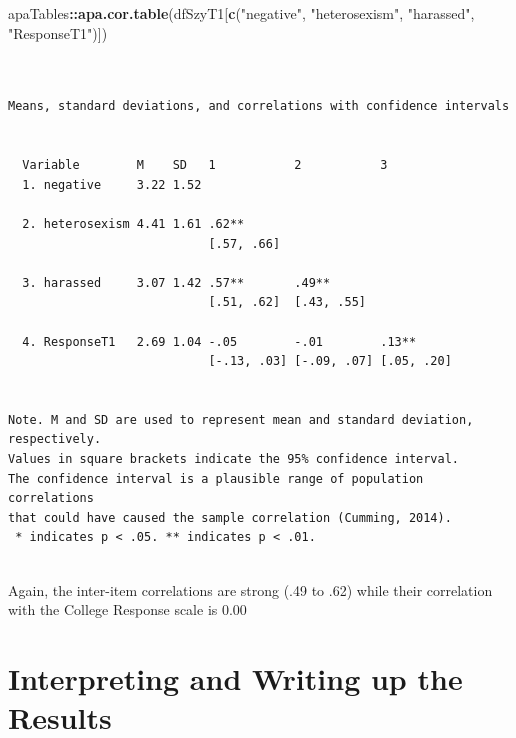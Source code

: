 \documentclass[
  english,
]{book}
\newenvironment{Shaded}{\begin{snugshade}}{\end{snugshade}}
\newcommand{\KeywordTok}[1]{\textcolor[rgb]{0.13,0.29,0.53}{\textbf{#1}}}
\newcommand{\NormalTok}[1]{#1}
\newcommand{\OperatorTok}[1]{\textcolor[rgb]{0.81,0.36,0.00}{\textbf{#1}}}
\newcommand{\StringTok}[1]{\textcolor[rgb]{0.31,0.60,0.02}{#1}}
\begin{document}
\begin{Shaded}
\begin{Highlighting}[]
\NormalTok{apaTables}\OperatorTok{::}\KeywordTok{apa.cor.table}\NormalTok{(dfSzyT1[}\KeywordTok{c}\NormalTok{(}\StringTok{"negative"}\NormalTok{, }\StringTok{"heterosexism"}\NormalTok{, }\StringTok{"harassed"}\NormalTok{, }\StringTok{"ResponseT1"}\NormalTok{)])}
\end{Highlighting}
\end{Shaded}

\begin{verbatim}


Means, standard deviations, and correlations with confidence intervals
 

  Variable        M    SD   1           2           3         
  1. negative     3.22 1.52                                   
                                                              
  2. heterosexism 4.41 1.61 .62**                             
                            [.57, .66]                        
                                                              
  3. harassed     3.07 1.42 .57**       .49**                 
                            [.51, .62]  [.43, .55]            
                                                              
  4. ResponseT1   2.69 1.04 -.05        -.01        .13**     
                            [-.13, .03] [-.09, .07] [.05, .20]
                                                              

Note. M and SD are used to represent mean and standard deviation, respectively.
Values in square brackets indicate the 95% confidence interval.
The confidence interval is a plausible range of population correlations 
that could have caused the sample correlation (Cumming, 2014).
 * indicates p < .05. ** indicates p < .01.
 
\end{verbatim}

Again, the inter-item correlations are strong (.49 to .62) while their correlation with the College Response scale is 0.00

\hypertarget{interpreting-and-writing-up-the-results}{%
\section{Interpreting and Writing up the Results}\label{interpreting-and-writing-up-the-results}}
\end{document}
